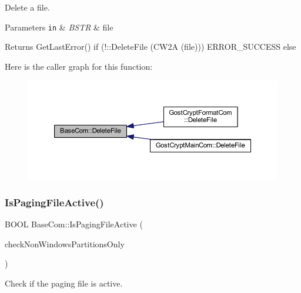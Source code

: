 Delete a file. 


\begin{DoxyParams}[1]{Parameters}
\mbox{\tt in}  & {\em B\+S\+TR} & file \\
\hline
\end{DoxyParams}
\begin{DoxyReturn}{Returns}
Get\+Last\+Error() if (!\+::\+Delete\+File (C\+W2A (file))) E\+R\+R\+O\+R\+\_\+\+S\+U\+C\+C\+E\+SS else 
\end{DoxyReturn}
Here is the caller graph for this function\+:
\nopagebreak
\begin{figure}[H]
\begin{center}
\leavevmode
\includegraphics[width=350pt]{class_base_com_a52133219ed5ad54607a6c417de0ba666_icgraph}
\end{center}
\end{figure}
\mbox{\label{class_base_com_a41aa000a52c4c44d20b142c8868ef4ea}} 
\subsubsection{\texorpdfstring{Is\+Paging\+File\+Active()}{IsPagingFileActive()}}
{\footnotesize\ttfamily B\+O\+OL Base\+Com\+::\+Is\+Paging\+File\+Active (\begin{DoxyParamCaption}\item[{B\+O\+OL}]{check\+Non\+Windows\+Partitions\+Only }\end{DoxyParamCaption})\hspace{0.3cm}{\ttfamily [static]}}



Check if the paging file is active. 


